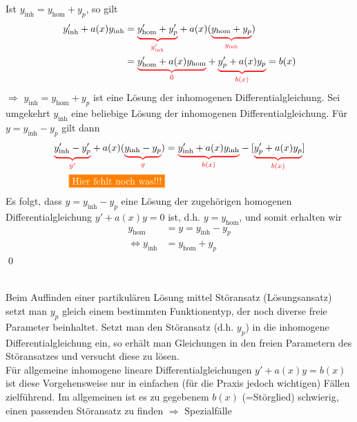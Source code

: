 
\Beweis Ist $y_\text{inh}=y_\text{hom}+y_p$, so gilt
\begin{align*}
y'_\text{inh}+a(x)y_\text{inh}&=\redunderbrace{y'_\text{hom}+y'_p}{y'_\text{inh}}+a(x)(\redunderbrace{y_\text{hom}+y_p}{y_\text{inh}})\\
&=\redunderbrace{y'_\text{hom}+a(x)y_\text{hom}}{0}+\redunderbrace{y'_p+a(x)y_p}{b(x)}=b(x)
\end{align*}
$\Rightarrow$ $y_\text{inh}=y_\text{hom}+y_p$ ist eine Lösung der inhomogenen Differentialgleichung. Sei umgekehrt $y_\text{inh}$ eine beliebige Lösung der inhomogenen Differentialgleichung. Für $y=y_\text{inh}-y_p$ gilt dann
\begin{align*}
\redunderbrace{y'_\text{inh}-y'_p}{y'}+a(x)(\redunderbrace{y_\text{inh}-y_p}{y})&=\redunderbrace{y'_\text{inh}+a(x)y_\text{inh}}{b(x)}-[\redunderbrace{y'_p+a(x)y_p}{b(x)}]\\
\placeholder
\end{align*}
Es folgt, dass $y=y_\text{inh}-y_p$ eine Lösung der zugehörigen homogenen Differentialgleichung $y'+a(x)y=0$ ist, d.h. $y=y_\text{hom}$, und somit erhalten wir
\begin{align*}
y_\text{hom}&=y=y_\text{inh}-y_p\\
\Leftrightarrow y_\text{inh}&=y_\text{hom}+y_p
\end{align*}
\qed

\\
Beim Auffinden einer partikulären Lösung mittel Störansatz (Lösungsansatz) setzt man $y_p$ gleich einem bestimmten Funktionentyp, der noch diverse freie Parameter beinhaltet. Setzt man den Störansatz (d.h. $y_p$) in die inhomogene Differentialgleichung ein, so erhält man Gleichungen in den freien Parametern des Störansatzes und versucht diese zu lösen.\\
Für allgemeine inhomogene lineare Differentialgleichungen $y'+a(x)y=b(x)$ ist diese Vorgehensweise nur in einfachen (für die Praxis jedoch wichtigen) Fällen zielführend. Im allgemeinen ist es zu gegebenem $b(x)$ (=Störglied) schwierig, einen passenden Störansatz zu finden $\Rightarrow$ Spezialfälle

